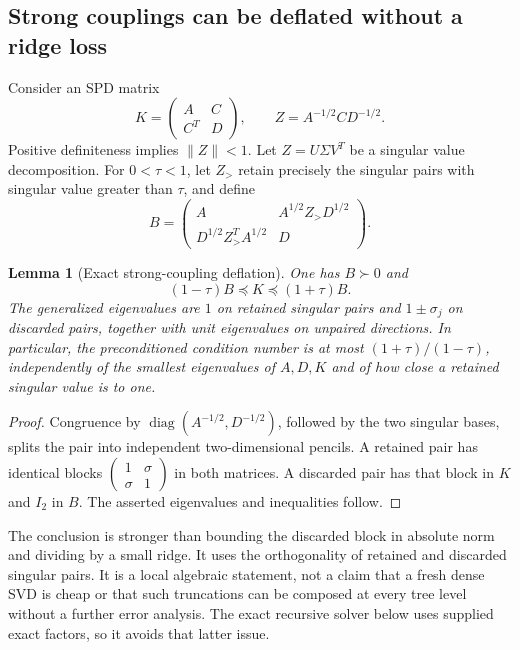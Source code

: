 \documentclass[11pt]{amsart}
\newtheorem{lemma}[theorem]{Lemma}
\theoremstyle{definition}\newtheorem{definition}[theorem]{Definition}
\theoremstyle{remark}\newtheorem{remark}[theorem]{Remark}
\numberwithin{equation}{section}
\newcommand{\diag}{\operatorname{diag}}
\begin{document}
\subsection{Strong couplings can be deflated without a ridge loss}
Consider an SPD matrix
\[
 K=\begin{pmatrix}A&C\\C^T&D\end{pmatrix},\qquad
 Z=A^{-1/2}CD^{-1/2}.
\]
Positive definiteness implies $\|Z\|<1$. Let
$Z=U\Sigma V^T$ be a singular value decomposition. For $0<\tau<1$,
let $Z_>$ retain precisely the singular pairs with singular value
greater than $\tau$, and define
\[
 B=\begin{pmatrix}
 A&A^{1/2}Z_>D^{1/2}\\
 D^{1/2}Z_>^TA^{1/2}&D
 \end{pmatrix}.
\]
\begin{lemma}[Exact strong-coupling deflation]\label{ifc:lem:deflate}
One has $B\succ0$ and
\begin{equation}\label{ifc:eq:deflate}
 (1-\tau)B\preceq K\preceq(1+\tau)B.
\end{equation}
The generalized eigenvalues are $1$ on retained singular pairs and
$1\pm\sigma_j$ on discarded pairs, together with unit eigenvalues on
unpaired directions. In particular, the preconditioned condition number
is at most $(1+\tau)/(1-\tau)$, independently of the smallest eigenvalues
of $A,D,K$ and of how close a retained singular value is to one.
\end{lemma}
\begin{proof}
Congruence by $\diag(A^{-1/2},D^{-1/2})$, followed by the two singular
bases, splits the pair into independent two-dimensional pencils. A
retained pair has identical blocks
$\left(\begin{smallmatrix}1&\sigma\\\sigma&1\end{smallmatrix}\right)$
in both matrices. A discarded pair has that block in $K$ and $I_2$
in $B$. The asserted eigenvalues and inequalities follow.
\end{proof}
The conclusion is stronger than bounding the discarded block in
absolute norm and dividing by a small ridge. It uses the orthogonality
of retained and discarded singular pairs. It is a local algebraic
statement, not a claim that a fresh dense SVD is cheap or that such
truncations can be composed at every tree level without a further
error analysis. The exact recursive solver below uses supplied exact
factors, so it avoids that latter issue.
\end{document}
